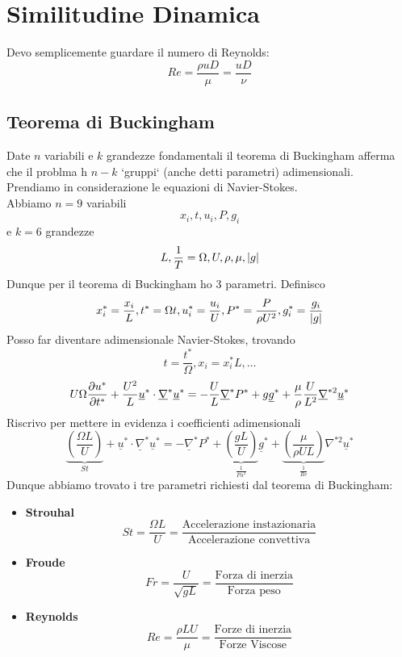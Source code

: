 
\section{Similitudine Dinamica}
Devo semplicemente guardare il numero di Reynolds:
\begin{equation}
  \label{eq:numero_reynolds}
  Re =\frac{\rho uD}{\mu }= \frac{uD}{\nu }
\end{equation}

\subsection{Teorema di Buckingham}
Date $ n $ variabili e $ k $ grandezze fondamentali il teorema di Buckingham afferma che il problma h $ n-k $ `gruppi` (anche detti parametri) adimensionali.\\
Prendiamo in considerazione le equazioni di Navier-Stokes. \\
Abbiamo $ n=9 $ variabili
\[
  x_i,t,u_i,P,g_i
\]
e $ k=6 $ grandezze
\[
  L,\frac{1}{T}=\Omega ,U,\rho,\mu,|g| 
\]
Dunque per il teorema di Buckingham ho 3 parametri. Definisco 
\[
  x_i^*=\frac{x_i}{L}, t^*=\Omega t, u_i^*=\frac{u_i}{U},P^*=\frac{P}{\rho U^2},g_i^*=\frac{g_i}{|g|}
\]
Posso far diventare adimensionale Navier-Stokes, trovando
\[
  t = \frac{t^*}{\Omega},x_i=x_i^*L, \dots 
\]
\[
  U\Omega \frac{\partial u^*}{\partial t^*}+\frac{U^2}{L}\underline{u}^*\cdot \underline{\nabla}^*\underline{u}^* = -\frac{U}{L}\underline{\nabla} ^*P^*+g \underline{g}^*+ \frac{\mu}{\rho }\frac{U}{L^2}\underline{\nabla}^{*2} \underline{u}^*
\]
Riscrivo per mettere in evidenza i coefficienti adimensionali
\[
  \underbrace{{\left( \frac{\Omega L}{U}\right)}}_{St} + \underline{u}^*\cdot \underline{\nabla} ^*\underline{u}^*=-\underline{\nabla} ^*P^*+\underbrace{{\left( \frac{gL}{U}\right)}}_{\frac{1}{Fn^2}}\underline{g}^* + \underbrace{{\left( \frac{\mu}{\rho UL}\right) }}_{\frac{1}{Re}}\nabla ^{*2}\underline{u}^*
\]
Dunque abbiamo trovato i tre parametri richiesti dal teorema di Buckingham:
\begin{itemize}
  \large
\item \textbf{Strouhal}
  \begin{equation}
    St = \frac{{\Omega L}}{U} = \frac{\text{Accelerazione instazionaria}}{\text{Accelerazione convettiva}}
  \end{equation}
\item \textbf{Froude}
  \begin{equation}
    Fr = \frac{U}{\sqrt{gL}}= \frac{\text{Forza di inerzia}}{\text{Forza peso}}
  \end{equation}
\item \textbf{Reynolds}
  \begin{equation}
    Re = \frac{{\rho LU}}{\mu } = \frac{\text{Forze di inerzia}}{\text{Forze Viscose}}
  \end{equation}
\end{itemize}

